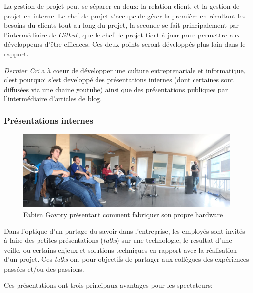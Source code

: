 \bigskip

La gestion de projet peut se séparer en deux: la relation client, et la
gestion de projet en interne. Le chef de projet s'occupe de gérer la
première en récoltant les besoins du clients tout au long du projet, la
seconde se fait principalement par l'intermédiaire de \emph{Github}, que
le chef de projet tient à jour pour permettre aux développeurs d'être
efficaces. Ces deux points seront développés plus loin dans le rapport.

\bigskip

\emph{Dernier Cri} a à coeur de développer une culture entreprenariale
et informatique, c'est pourquoi s'est developpé des présentations
internes (dont certaines sont diffusées via une chaine youtube) ainsi
que des présentations publiques par l'intermédiaire d'articles de blog.

\subsubsection{Présentations internes}\label{pruxe9sentations-internes}

\begin{figure}[h]
  \centering
  \includegraphics[height=4cm]{figures/talk.jpg}
  \caption{Fabien Gavory présentant comment fabriquer son propre hardware}
\end{figure}

\bigskip

Dans l'optique d'un partage du savoir dans l'entreprise, les employés
sont invités à faire des petites présentations (\emph{talks}) sur une
technologie, le resultat d'une veille, ou certains enjeux et solutions
techniques en rapport avec la réalisation d'un projet. Ces \emph{talks}
ont pour objectifs de partager aux collègues des expériences passées
et/ou des passions.

\bigskip

Ces présentations ont trois principaux avantages pour les spectateurs:

